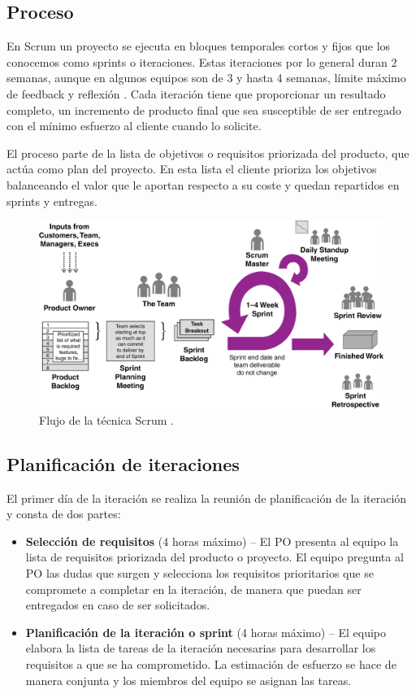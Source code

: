 \subsection{Proceso}
En Scrum un proyecto se ejecuta en bloques temporales cortos y fijos que los conocemos como sprints o iteraciones. Estas iteraciones por lo general duran 2 semanas, aunque en algunos equipos son de 3 y hasta 4 semanas, límite máximo de feedback y reflexión \citep{davis_agile_2015}. Cada iteración tiene que proporcionar un resultado completo, un incremento de producto final que sea susceptible de ser entregado con el mínimo esfuerzo al cliente cuando lo solicite.

El proceso parte de la lista de objetivos o requisitos priorizada del producto, que actúa como plan del proyecto. En esta lista el cliente prioriza los objetivos balanceando el valor que le aportan respecto a su coste y quedan repartidos en sprints y entregas.

\begin{figure}[H]
\centering
\includegraphics[width=125mm,scale=1]{Figuras/flujo_scrum}
\caption{Flujo de la técnica Scrum \citep{cobb2015project}.}
  \label{flujo_scrum}
\end{figure}

\subsection{Planificación de iteraciones}
El primer día de la iteración se realiza la reunión de planificación de la iteración y consta de dos partes:
\begin{itemize}
    \item \textbf{Selección de requisitos} (4 horas máximo) – El PO presenta al equipo la lista de requisitos priorizada del producto o proyecto. El equipo pregunta al PO las dudas que surgen y selecciona los requisitos prioritarios que se compromete a completar en la iteración, de manera que puedan ser entregados en caso de ser solicitados.
    \item \textbf{Planificación de la iteración o sprint} (4 horas máximo) – El equipo elabora la lista de tareas de la iteración necesarias para desarrollar los requisitos a que se ha comprometido. La estimación de esfuerzo se hace de manera conjunta y los miembros del equipo se asignan las tareas.
\end{itemize}

